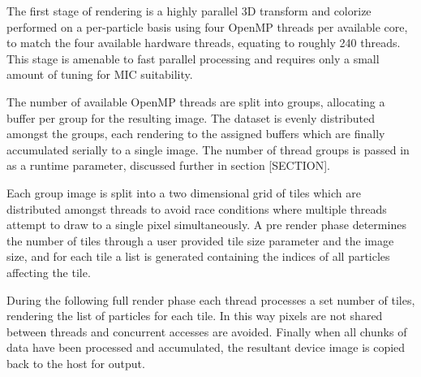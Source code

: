 \documentclass[runningheads,a4paper]{llncs}
\begin{document}

The first stage of rendering is a highly parallel 3D transform and colorize performed on a per-particle basis using 
four OpenMP threads per available core, to match the four available hardware threads, equating to roughly 240 threads. This 
stage is amenable to fast parallel processing and requires only a small amount of tuning for MIC suitability.


The number of available OpenMP threads are split into groups, allocating a buffer per group for the resulting image. 
The dataset is evenly distributed amongst the groups, each rendering to the assigned buffers which are finally 
accumulated serially to a single image. The number of thread groups is passed in as a runtime parameter, discussed further 
in section [SECTION].

Each group image is split into a two dimensional grid of tiles which are distributed amongst threads to avoid race 
conditions where multiple threads attempt to draw to a single pixel simultaneously. A pre render phase determines the 
number of tiles through a user provided tile size parameter and the image size, and for each tile a list is 
generated containing the indices of all particles affecting the tile.

During the following full render phase each thread processes a set number of tiles, rendering the list of particles 
for each tile. In this way pixels are not shared between threads and concurrent accesses are avoided. Finally when all 
chunks of data have been processed and accumulated, the resultant device image is copied back to the host for output. 
\end{document}
